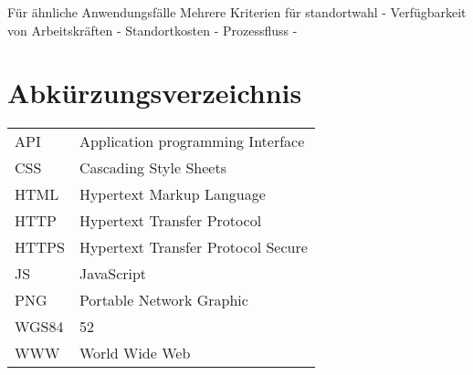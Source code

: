 \documentclass[a4paper, twoside, 12pt]{scrreprt}
\begin{document}
Für ähnliche Anwendungsfälle
Mehrere Kriterien für standortwahl
- Verfügbarkeit von Arbeitskräften
- Standortkosten
- Prozessfluss
- 
\section{Abkürzungsverzeichnis}
\begin{tabular}{ll}
	API		&Application programming Interface\\
	CSS		&Cascading Style Sheets\\
	HTML	&Hypertext Markup Language\\
	HTTP	&Hypertext Transfer Protocol\\
	HTTPS	&Hypertext Transfer Protocol Secure\\
	JS		&JavaScript\\
	PNG		&Portable Network Graphic\\
	WGS84	&52\\
	WWW		&World Wide Web\\
\end{tabular}

{}

\end{document}
